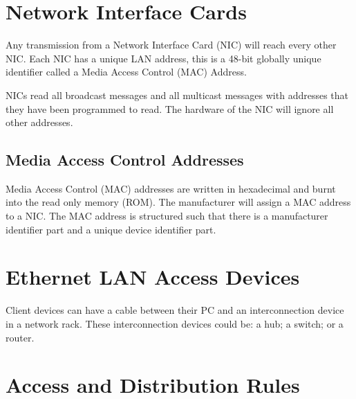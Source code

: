 
\section*{Network Interface Cards}
Any transmission from a Network Interface Card (NIC) will reach every other NIC. Each NIC has a unique LAN address, this is a 48-bit globally unique identifier called a Media Access Control (MAC) Address.

NICs read all broadcast messages and all multicast messages with addresses that they have been programmed to read. The hardware of the NIC will ignore all other addresses.
\subsection*{Media Access Control Addresses}
Media Access Control (MAC) addresses are written in hexadecimal and burnt into the read only memory (ROM). The manufacturer will assign a MAC address to a NIC. The MAC address is structured such that there is a manufacturer identifier part and a unique device identifier part. 

\section*{Ethernet LAN Access Devices}
Client devices can have a cable between their PC and an interconnection device in a network rack. These interconnection devices could be: a hub; a switch; or a router.

\section*{Access and Distribution Rules}
